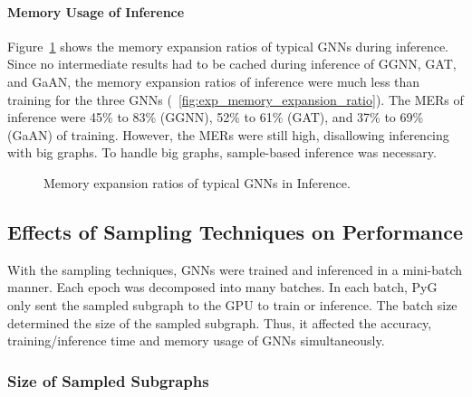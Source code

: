 \paragraph{Memory Usage of Inference}

Figure~\ref{fig:exp_inference_memory_expansion_ratio} shows the memory expansion ratios of typical GNNs during inference.
%
Since no intermediate results had to be cached during inference of GGNN, GAT, and GaAN,
the memory expansion ratios of inference were much less than training for the three GNNs (\figurename~\ref{fig:exp_memory_expansion_ratio}).
%
The MERs of inference were 45\% to 83\% (GGNN), 52\% to 61\% (GAT), and 37\% to 69\% (GaAN) of training.
%
However, the MERs were still high, disallowing inferencing with big graphs.
%
To handle big graphs, sample-based inference was necessary.

\begin{figure}[H]
   \centering
   \caption{Memory expansion ratios of typical GNNs in Inference.}
   \label{fig:exp_inference_memory_expansion_ratio}
\end{figure}

\subsection{Effects of Sampling Techniques on Performance}
\label{sec:effects_of_sampling_techniques_on_performance}

With the sampling techniques, GNNs were trained and inferenced in a mini-batch manner.
%
Each epoch was decomposed into many batches.
%
In each batch, PyG only sent the sampled subgraph to the GPU to train or inference.
%
The batch size determined the size of the sampled subgraph.
%
Thus, it affected the accuracy, training/inference time and memory usage of GNNs simultaneously.

\subsubsection{Size of Sampled Subgraphs}

